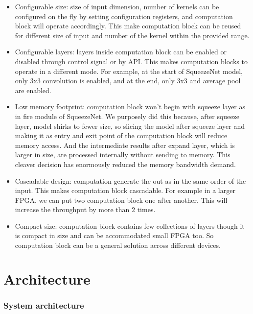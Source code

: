 \documentclass[conference]{IEEEtran}
\begin{document}
\begin{itemize}
\item Configurable size: size of input dimension, number of kernels can be configured on the fly by setting configuration registers, and computation block will operate accordingly. This make computation block can be reused for different size of input and number of the kernel within the provided range.

\item Configurable layers: layers inside computation block can be enabled or disabled through control signal or by API. This makes computation blocks to operate in a different mode. For example, at the start of SqueezeNet model, only 3x3 convolution is enabled, and at the end, only 3x3 and average pool are enabled.

\item Low memory footprint: computation block won't begin with squeeze layer as in fire module of SqueezeNet. We purposely did this because, after squeeze layer, model shirks to fewer size, so slicing the model after squeeze layer and making it as entry and exit point of the computation block will reduce memory access. And the intermediate results after expand layer, which is larger in size, are processed internally without sending to memory. This cleaver decision has enormously reduced the memory bandwidth demand. 


\item Cascadable design: computation generate the out as in the same order of the input. This makes computation block cascadable. For example in a larger FPGA, we can put two computation block one after another. This will increase the throughput by more than 2 times.

\item Compact size: computation block contains few collections of layers though it is compact in size and can be accommodated small FPGA too. So computation block can be a general solution across different devices.

\end{itemize}

\section{Architecture}
\subsubsection{System architecture}
\end{document}

